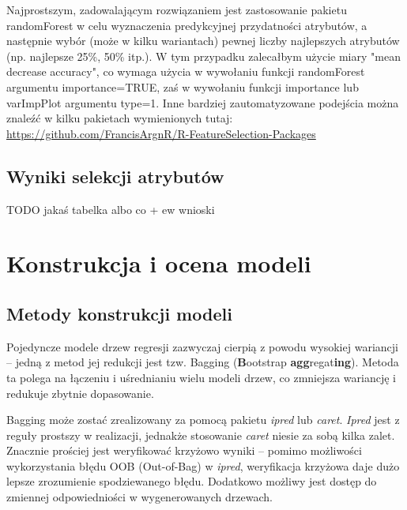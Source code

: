 \documentclass[a4paper,11pt,twoside]{mwrep}  %
\begin{document}
Najprostszym, zadowalającym rozwiązaniem jest zastosowanie pakietu randomForest w celu wyznaczenia predykcyjnej przydatności atrybutów, a następnie wybór (może w kilku wariantach) pewnej liczby najlepszych atrybutów (np. najlepsze 25\%, 50\% itp.). W tym przypadku zalecałbym użycie miary "mean decrease accuracy", co wymaga użycia w wywołaniu funkcji randomForest argumentu importance=TRUE, zaś w wywołaniu funkcji importance lub varImpPlot argumentu type=1. Inne bardziej zautomatyzowane podejścia można znaleźć w kilku pakietach wymienionych tutaj: {\url{https://github.com/FrancisArgnR/R-FeatureSelection-Packages}}

\section{Wyniki selekcji atrybutów}
TODO jakaś tabelka albo co + ew wnioski\\

\endgroup



\begingroup
\let\clearpage\relax
\chapter{Konstrukcja i ocena modeli}

\section{Metody konstrukcji modeli}
Pojedyncze modele drzew regresji zazwyczaj cierpią z powodu wysokiej wariancji -- jedną z metod jej redukcji jest tzw. Bagging (\textbf{B}ootstrap \textbf{agg}regat\textbf{ing}). 
Metoda ta polega na łączeniu i uśrednianiu wielu modeli drzew, co  zmniejsza wariancję i redukuje zbytnie dopasowanie.

Bagging może zostać zrealizowany za pomocą pakietu
\textit{ipred} 
lub
\textit{caret}. 
\textit{Ipred} jest z reguły prostszy w realizacji, jednakże stosowanie \textit{caret} niesie za sobą kilka zalet.
Znacznie prościej jest weryfikować krzyżowo wyniki -- pomimo możliwości wykorzystania błędu OOB (Out-of-Bag) w \textit{ipred}, weryfikacja krzyżowa daje dużo lepsze zrozumienie spodziewanego błędu. 
Dodatkowo możliwy jest dostęp do zmiennej odpowiedniości w wygenerowanych drzewach.
\end{document}
